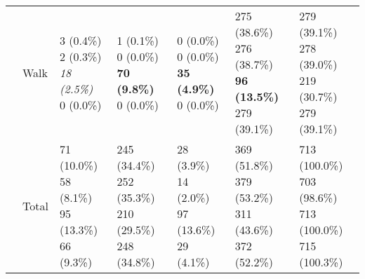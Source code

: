 \documentclass[10pt]{article}
\begin{document}
\begin{table}
\begin{center}
\begin{small}
\begin{tabular}{lllllll}
& Walk      &  \makecell[l]{\textnormal{3 (0.4\%)} \\\textnormal{2 (0.3\%)} \\\textit{18 (2.5\%)} \\\textnormal{0 (0.0\%)}}      &  \makecell[l]{\textnormal{1 (0.1\%)} \\\textnormal{0 (0.0\%)} \\\textbf{70 (9.8\%)} \\\textnormal{0 (0.0\%)}}      &  \makecell[l]{\textnormal{0 (0.0\%)} \\\textnormal{0 (0.0\%)} \\\textbf{35 (4.9\%)} \\\textnormal{0 (0.0\%)}}      &  \makecell[l]{\textnormal{275 (38.6\%)} \\\textnormal{276 (38.7\%)} \\\textbf{96 (13.5\%)} \\\textnormal{279 (39.1\%)}}      & \makecell[l]{279 (39.1\%) \\278 (39.0\%) \\219 (30.7\%) \\279 (39.1\%) \\} \\ \cline{2-7}
& Total      & \makecell[l]{71 (10.0\%) \\58 (8.1\%) \\95 (13.3\%) \\66 (9.3\%) \\}      & \makecell[l]{245 (34.4\%) \\252 (35.3\%) \\210 (29.5\%) \\248 (34.8\%) \\}      & \makecell[l]{28 (3.9\%) \\14 (2.0\%) \\97 (13.6\%) \\29 (4.1\%) \\}      & \makecell[l]{369 (51.8\%) \\379 (53.2\%) \\311 (43.6\%) \\372 (52.2\%) \\}      & \makecell[l]{713 (100.0\%)  \\703 (98.6\%)  \\713 (100.0\%)  \\715 (100.3\%)  \\} \\ 


\end{tabular}
\end{small}
\end{center}
\end{table}
\end{document}
